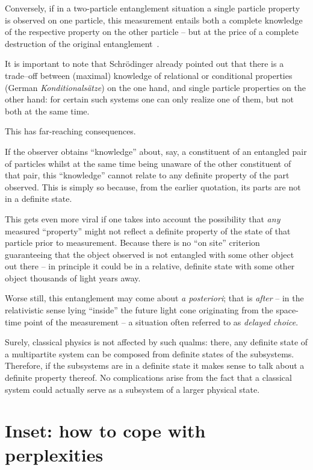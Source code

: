 Conversely, if in a two-particle entanglement situation  a single particle property is observed on one particle,
this measurement entails both a complete knowledge of the respective property on the other particle
-- but at the price of
a complete destruction of the original entanglement~\cite[p.~844]{schrodinger}.

It is important to note that Schr\"odinger already pointed out that there is a trade--off between (maximal) knowledge of relational or conditional properties
(German {\it Konditionals\"atze})
on the one hand, and single particle properties on the other hand:
for certain such systems one can only realize one of them, but not both at the same time.

This has far-reaching consequences.

If the observer obtains ``knowledge'' about, say, a constituent of an entangled pair of particles
whilst at the same time being unaware of the other constituent of that pair, this ``knowledge''
cannot relate to any definite property of the part observed.
This is simply so because, from the earlier quotation,
its parts are not in a definite state.

This gets even more viral if one takes into account the possibility
that {\em any} measured ``property'' might not reflect a definite property of the state of that particle prior to measurement.
Because there is no ``on site'' criterion guaranteeing that the object observed is not entangled with some other object out there --
in principle it could be in a relative, definite state with some other object thousands of light years away.

Worse still, this entanglement may come about {\it a posteriori}; that is {\em after}
--
in the relativistic sense lying ``inside'' the future light cone originating from the space-time point of the measurement
--
a situation often referred to as {\em delayed choice}.

Surely, classical physics is not affected by such qualms:
there, any definite state of a multipartite system can be composed from definite states of the subsystems.
Therefore, if the subsystems are in a definite state it makes sense to talk about a definite property thereof.
No complications arise from the fact that a classical system could actually serve as a subsystem of a larger physical state.





\section{Inset: how to cope with perplexities}

